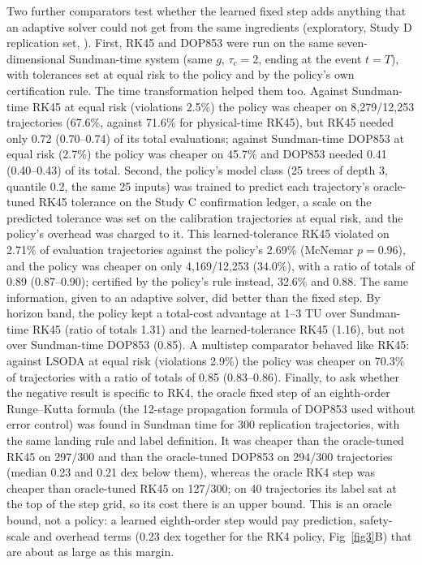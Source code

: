 \documentclass[10pt,letterpaper]{article}
\begin{document}
Two further comparators test whether the learned fixed step adds anything that an adaptive solver could not get from the same ingredients (exploratory, Study D replication set, ). First, RK45 and DOP853 were run on the same seven-dimensional Sundman-time system (same $g$, $\tau_{c} = 2$, ending at the event $t = T$), with tolerances set at equal risk to the policy and by the policy's own certification rule. The time transformation helped them too. Against Sundman-time RK45 at equal risk (violations 2.5\%) the policy was cheaper on 8,279/12,253 trajectories (67.6\%, against 71.6\% for physical-time RK45), but RK45 needed only 0.72 (0.70--0.74) of its total evaluations; against Sundman-time DOP853 at equal risk (2.7\%) the policy was cheaper on 45.7\% and DOP853 needed 0.41 (0.40--0.43) of its total. Second, the policy's model class (25 trees of depth 3, quantile 0.2, the same 25 inputs) was trained to predict each trajectory's oracle-tuned RK45 tolerance on the Study C confirmation ledger, a scale on the predicted tolerance was set on the calibration trajectories at equal risk, and the policy's overhead was charged to it. This learned-tolerance RK45 violated on 2.71\% of evaluation trajectories against the policy's 2.69\% (McNemar $p = 0.96$), and the policy was cheaper on only 4,169/12,253 (34.0\%), with a ratio of totals of 0.89 (0.87--0.90); certified by the policy's rule instead, 32.6\% and 0.88. The same information, given to an adaptive solver, did better than the fixed step. By horizon band, the policy kept a total-cost advantage at 1--3 TU over Sundman-time RK45 (ratio of totals 1.31) and the learned-tolerance RK45 (1.16), but not over Sundman-time DOP853 (0.85). A multistep comparator behaved like RK45: against LSODA at equal risk (violations 2.9\%) the policy was cheaper on 70.3\% of trajectories with a ratio of totals of 0.85 (0.83--0.86). Finally, to ask whether the negative result is specific to RK4, the oracle fixed step of an eighth-order Runge--Kutta formula (the 12-stage propagation formula of DOP853 used without error control) was found in Sundman time for 300 replication trajectories, with the same landing rule and label definition. It was cheaper than the oracle-tuned RK45 on 297/300 and than the oracle-tuned DOP853 on 294/300 trajectories (median 0.23 and 0.21 dex below them), whereas the oracle RK4 step was cheaper than oracle-tuned RK45 on 127/300; on 40 trajectories its label sat at the top of the step grid, so its cost there is an upper bound. This is an oracle bound, not a policy: a learned eighth-order step would pay prediction, safety-scale and overhead terms (0.23 dex together for the RK4 policy, Fig~\ref{fig3}B) that are about as large as this margin.
\end{document}
